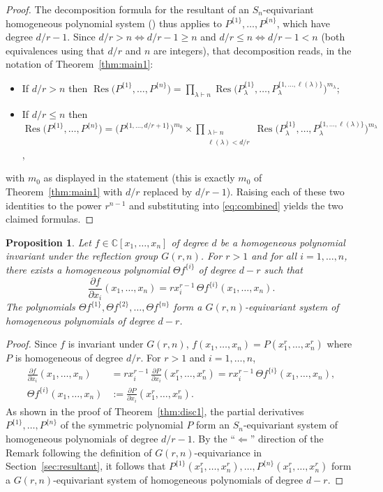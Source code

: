 \documentclass[12pt]{amsart}
\newtheorem{proposition}[theorem]{Proposition}
\theoremstyle{definition}
\newcommand{\Res}{\operatorname{Res}}
\DeclareMathOperator{\len}{\ell}
\begin{document}
\begin{proof}
The decomposition formula for the resultant of an $S_n$-equivariant homogeneous polynomial system (\citep{BuseKarasoulou2016}) thus applies to $P^{\{1\}},\dots,P^{\{n\}}$, which have degree $d/r - 1$. Since $d/r > n \iff d/r-1 \geqslant n$ and $d/r \leqslant n \iff d/r - 1 < n$ (both equivalences using that $d/r$ and $n$ are integers), that decomposition reads, in the notation of Theorem~\ref{thm:main1}:
\begin{itemize}
\item If $d/r > n$ then $\displaystyle \Res\big(P^{\{1\}},\dots,P^{\{n\}}\big) = \prod_{\lambda \vdash n} \Res\Big(P^{\{1\}}_\lambda,\dots,P^{\{1,\dots,\len(\lambda)\}}_\lambda\Big)^{m_\lambda}$;
\item If $d/r \leqslant n$ then $\displaystyle \Res\big(P^{\{1\}},\dots,P^{\{n\}}\big) = \Big(P^{\{1,\dots,d/r+1\}}\Big)^{m_0} \times \prod_{\substack{\lambda\vdash n\\ \len(\lambda)<d/r}} \Res\Big(P^{\{1\}}_\lambda,\dots,P^{\{1,\dots,\len(\lambda)\}}_\lambda\Big)^{m_\lambda}$,
\end{itemize}
with $m_0$ as displayed in the statement (this is exactly $m_0$ of Theorem~\ref{thm:main1} with $d/r$ replaced by $d/r-1$). Raising each of these two identities to the power $r^{n-1}$ and substituting into \eqref{eq:combined} yields the two claimed formulas.
\end{proof}

\begin{proposition}
\label{prop:theta}
Let $f \in \mathbb{C}[x_1,\dots,x_n]$ of degree $d$ be a homogeneous polynomial invariant under the reflection group $G(r,n)$. For $r>1$ and for all $i=1,\dots,n$, there exists a homogeneous polynomial $\Theta f^{\{i\}}$ of degree $d-r$ such that
\[
\frac{\partial f}{\partial x_i}(x_1,\dots,x_n) = r x_i^{r-1}\, \Theta f^{\{i\}}(x_1,\dots,x_n).
\]
The polynomials $\Theta f^{\{1\}},\Theta f^{\{2\}},\dots,\Theta f^{\{n\}}$ form a $G(r,n)$-equivariant system of homogeneous polynomials of degree $d-r$.
\end{proposition}

\begin{proof}
Since $f$ is invariant under $G(r,n)$, $f(x_1,\dots,x_n) = P(x_1^r,\dots,x_n^r)$ where $P$ is homogeneous of degree $d/r$. For $r>1$ and $i=1,\dots,n$,
\begin{align*}
\frac{\partial f}{\partial x_i}(x_1,\dots,x_n) &= r x_i^{r-1}\, \frac{\partial P}{\partial x_i}(x_1^r,\dots,x_n^r) = r x_i^{r-1}\,\Theta f^{\{i\}}(x_1,\dots,x_n), \\
\Theta f^{\{i\}}(x_1,\dots,x_n) &:= \frac{\partial P}{\partial x_i}(x_1^r,\dots,x_n^r).
\end{align*}
As shown in the proof of Theorem~\ref{thm:disc1}, the partial derivatives $P^{\{1\}},\dots,P^{\{n\}}$ of the symmetric polynomial $P$ form an $S_n$-equivariant system of homogeneous polynomials of degree $d/r-1$. By the ``$\Leftarrow$'' direction of the Remark following the definition of $G(r,n)$-equivariance in Section~\ref{sec:resultant}, it follows that $P^{\{1\}}(x_1^r,\dots,x_n^r),\dots,P^{\{n\}}(x_1^r,\dots,x_n^r)$ form a $G(r,n)$-equivariant system of homogeneous polynomials of degree $d-r$.
\end{proof}
\end{document}
